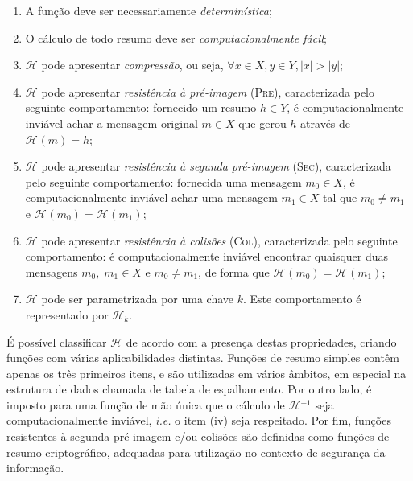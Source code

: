 \documentclass{ufsctex/ufsctex}
\newcommand{\hh}{\mathcal{H}}
\newcommand{\hash}[2][]{\mathcal{H}^{#1} (#2)}
\newcommand{\length}[1]{\vert{} #1 \vert{}}
\begin{document}
\begin{enumerate}[label= (\roman*)]

  \item A função deve ser necessariamente \emph{determinística};

  \item O cálculo de todo resumo deve ser \emph{computacionalmente fácil};

  \item $\hh{}$ pode apresentar \emph{compressão}, ou seja,
      $\forall x \in X, y \in Y, \length{x} > \length{y}$;

  \item $\hh{}$ pode apresentar \emph{resistência à pré-imagem} (\textsc{Pre}),
      caracterizada pelo seguinte comportamento: fornecido um resumo $h \in Y$,
        é computacionalmente inviável achar a mensagem original $m \in X$ que
        gerou $h$ através de $\hash{m} = h$;

  \item $\hh{}$ pode apresentar \emph{resistência à segunda pré-imagem}
      (\textsc{Sec}), caracterizada pelo seguinte comportamento: fornecida uma
        mensagem $m_0 \in X$, é computacionalmente inviável achar uma mensagem
        $m_1 \in X$ tal que $m_0 \neq m_1$ e $\hash{m_0} = \hash{m_1}$;

  \item $\hh{}$ pode apresentar \emph{resistência à colisões} (\textsc{Col}),
      caracterizada pelo seguinte comportamento: é computacionalmente inviável
        encontrar quaisquer duas mensagens $m_0, \; m_1 \in X$ e $m_0 \neq
        m_1$, de forma que $\hash{m_0} = \hash{m_1}$;

  \item $\hh{}$ pode ser parametrizada por uma chave $k$. Este comportamento
      é representado por $\hh{}_k$.

\end{enumerate}

É possível classificar $\hh{}$ de acordo com a presença destas propriedades,
criando funções com várias aplicabilidades distintas. Funções de resumo simples
contêm apenas os três primeiros itens, e são utilizadas em vários âmbitos, em
especial na estrutura de dados chamada de tabela de espalhamento. Por outro
lado, é imposto para uma função de mão única que o cálculo de $\hh{}^{-1}$ seja
computacionalmente inviável, \emph{i.e.} o item (iv) seja respeitado. Por fim,
funções resistentes à segunda pré-imagem e/ou colisões são definidas como
funções de resumo criptográfico, adequadas para utilização no contexto de
segurança da informação.
\end{document}
